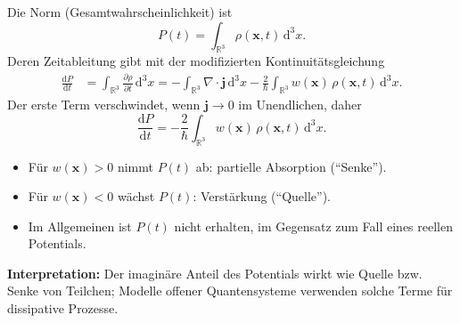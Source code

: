 \documentclass[a4paper,12pt]{article}
\begin{document}
Die Norm (Gesamtwahrscheinlichkeit) ist
\[
P(t) = \int_{\mathbb{R}^3} \rho(\mathbf{x},t)\,\mathrm{d}^3x.
\]
Deren Zeitableitung gibt mit der modifizierten Kontinuitätsgleichung
\begin{align*}
  \frac{\mathrm{d}P}{\mathrm{d}t}
  &= \int_{\mathbb{R}^3} \frac{\partial \rho}{\partial t}\,\mathrm{d}^3x
   = -\int_{\mathbb{R}^3} \nabla\cdot\mathbf{j}\,\mathrm{d}^3x
     - \tfrac{2}{\hbar}\int_{\mathbb{R}^3}w(\mathbf{x})\,\rho(\mathbf{x},t)\,\mathrm{d}^3x.
\end{align*}
Der erste Term verschwindet, wenn $\mathbf{j}\to0$ im Unendlichen, daher
\[
\boxed{\frac{\mathrm{d}P}{\mathrm{d}t} = -\frac{2}{\hbar} \int_{\mathbb{R}^3} w(\mathbf{x})\,\rho(\mathbf{x},t)\,\mathrm{d}^3x.}
\]

\begin{itemize}
  \item Für $w(\mathbf{x})>0$ nimmt $P(t)$ ab: partielle Absorption (\enquote{Senke}).
  \item Für $w(\mathbf{x})<0$ wächst $P(t)$: Verstärkung (\enquote{Quelle}).
  \item Im Allgemeinen ist $P(t)$ nicht erhalten, im Gegensatz zum Fall eines reellen Potentials.
\end{itemize}

\textbf{Interpretation:} Der imagi­näre Anteil des Potentials wirkt wie Quelle bzw. Senke von Teilchen; Modelle offener Quantensysteme verwenden solche Terme für dissipative Prozesse.
\end{document}
